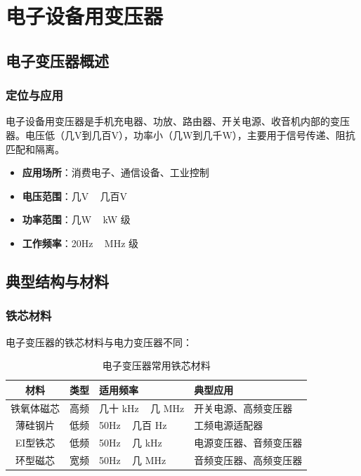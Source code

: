\documentclass[12pt,UTF8]{ctexbook}
\begin{document}
\part{电子设备用变压器}

\chapter{电子变压器概述}
\label{chap:electronic_overview}

\section{定位与应用}

电子设备用变压器是手机充电器、功放、路由器、开关电源、收音机内部的变压器。电压低（几V到几百V），功率小（几W到几千W），主要用于信号传递、阻抗匹配和隔离。

\begin{itemize}[leftmargin=2cm]
    \item \textbf{应用场所}：消费电子、通信设备、工业控制
    \item \textbf{电压范围}：几V ~ 几百V
    \item \textbf{功率范围}：几W ~ kW 级
    \item \textbf{工作频率}：20Hz ~ MHz 级
\end{itemize}

\chapter{典型结构与材料}
\label{chap:electronic_structure}

\section{铁芯材料}

电子变压器的铁芯材料与电力变压器不同：

\begin{table}[htbp]
\centering
\caption{电子变压器常用铁芯材料}
\begin{tabular}{|c|c|p{6cm}|p{4cm}|}
\hline
\textbf{材料} & \textbf{类型} & \textbf{适用频率} & \textbf{典型应用} \\
\hline
铁氧体磁芯 & 高频 & 几十 kHz ~ 几 MHz & 开关电源、高频变压器 \\
\hline
薄硅钢片 & 低频 & 50Hz ~ 几百 Hz & 工频电源适配器 \\
\hline
EI型铁芯 & 低频 & 50Hz ~ 几 kHz & 电源变压器、音频变压器 \\
\hline
环型磁芯 & 宽频 & 50Hz ~ 几 MHz & 音频变压器、高频变压器 \\
\hline
\end{tabular}
\end{table}
\end{document}
